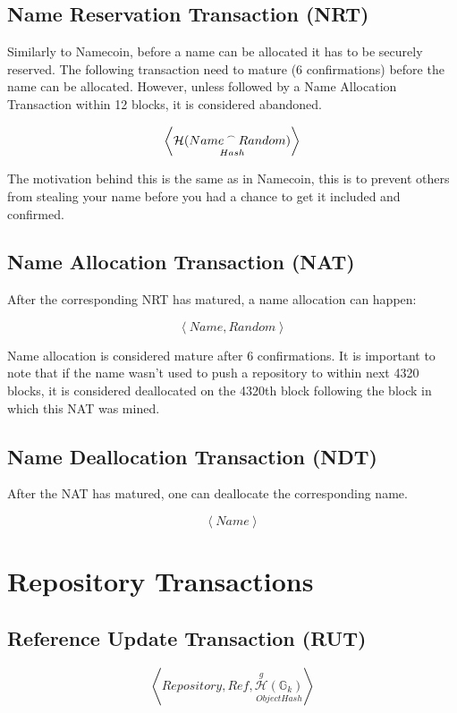 \documentclass[a4paper]{article}
\newcommand{\concatA}{%
  \mathbin{\raisebox{1ex}{\scalebox{.7}{$\frown$}}}%
}
\newcommand{\Ghash}{\mathcal{H}}
\newcommand{\Ggithash}{\overset{g}{\mathcal{H}}}
\newcommand{\Ggitobject}{\mathbb{G}}
\newcommand{\tuple}[1]{\ensuremath{\left \langle #1 \right \rangle }}
\begin{document}
\subsection{Name Reservation Transaction (NRT)}

Similarly to Namecoin, before a name can be allocated it has to be securely reserved. The following transaction need to mature (6 confirmations) before the name can be allocated. However, unless followed by a Name Allocation Transaction
within 12 blocks, it is considered abandoned.


$$
\tuple{\underset{Hash}{\Ghash(Name \concatA Random)}}
$$

The motivation behind this is the same as in Namecoin, this is to prevent others from stealing your name before you had a chance to get it included and confirmed.

\subsection{Name Allocation Transaction (NAT)}

After the corresponding NRT has matured, a name allocation can happen:

$$
\tuple{Name, Random}
$$

Name allocation is considered mature after 6 confirmations. It is important to note that if the name wasn't used to push a repository to
within next 4320 blocks, it is considered deallocated on the 4320th block following the block in which this NAT was mined.

\subsection{Name Deallocation Transaction (NDT)}

After the NAT has matured, one can deallocate the corresponding name.

$$
\tuple{Name}
$$

\section{Repository Transactions}

\subsection{Reference Update Transaction (RUT)}

$$
\tuple{Repository, Ref, \underset{ObjectHash}{\Ggithash(\Ggitobject_{k})}}
$$
\end{document}
